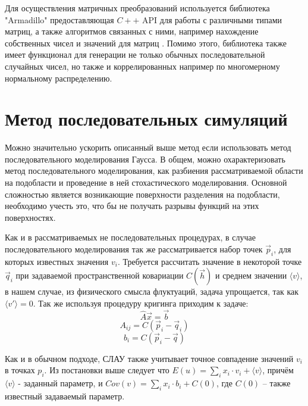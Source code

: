 Для осуществления матричных преобразований используется библиотека "Armadillo" предоставляющая $C++$ API для работы с различными типами матриц, а также алгоритмов связанных с ними, например нахождение собственных чисел и значений для матриц \cite{sanderson2016armadillo, sanderson2018user}. Помимо этого, библиотека также имеет функционал для генерации не только обычных последовательной случайных чисел, но также и коррелированных например по многомерному нормальному распределению.

\section{Метод последовательных симуляций} \label{sect1_4}

Можно значительно ускорить описанный выше метод если использовать метод последовательного моделирования Гаусса. В общем, можно охарактеризовать метод последовательного моделирования, как разбиения рассматриваемой области на подобласти и проведение в ней стохастического моделирования. Основной сложностью является возникающие поверхности разделения на подобласти, необходимо учесть это, что бы не получать разрывы функций на этих поверхностях. 

Как и в рассматриваемых не последовательных процедурах, в случае последовательного моделирования так же рассматривается набор точек $\vec p_i$, для которых известных значения $v_i$. Требуется рассчитать значение в некоторой точке $\vec q_i$ при задаваемой пространственной ковариации $C(\vec h)$ и среднем значении $\langle v \rangle$, в нашем случае, из физического смысла флуктуаций, задача упрощается, так как $\langle v' \rangle=0$. Так же используя процедуру кригинга приходим к задаче:
\begin{equation}
    \label{eq:kriging_seq_1}
    \hat{A} \vec x = \vec b
\end{equation}
\begin{equation}
    \label{eq:kriging_seq_2}
    A_{ij} = C(\vec p_i - \vec q_i)
\end{equation}
\begin{equation}
    \label{eq:kriging_seq_3}
    b_i = C(\vec p_i - \vec q)
\end{equation}

Как и в обычном подходе, СЛАУ также учитывает точное совпадение значений $v_i$ в точках $p_i$. Из постановки выше следует что $E(u) = \sum_{i} x_i \cdot v_i + \langle v \rangle$, причём $\langle v \rangle$ - заданный параметр, и $Cov(v) = \sum_{i} x_i \cdot b_i + C(0)$, где $C(0)$ -- также известный задаваемый параметр.

